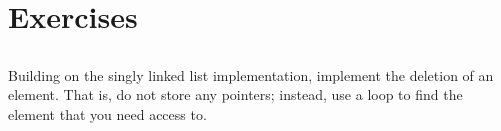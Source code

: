 \section{Exercises}

\subsection{\ReviewQuestions}

\subsection{\EasyQuestions}

\begin{exercise}
Building on the singly linked list implementation,
implement the deletion of an element.
That is, do not store any  pointers;
instead, use a loop to find the element that you need access to.
\end{exercise}

\subsection{\MediumQuestions}

\subsection{\HarderQuestions}

